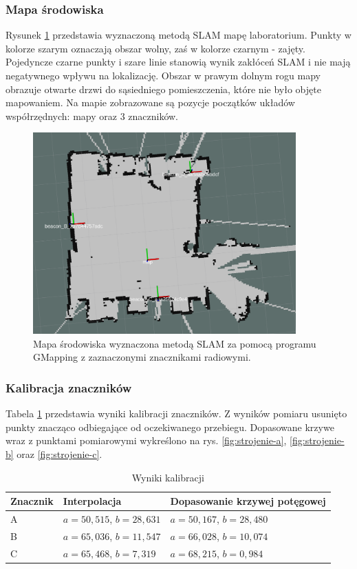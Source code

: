 \subsubsection{Mapa środowiska}
Rysunek \ref{fig:mapa} przedstawia wyznaczoną metodą SLAM mapę laboratorium. Punkty w kolorze szarym oznaczają obszar wolny, zaś w kolorze czarnym - zajęty. Pojedyncze czarne punkty i szare linie stanowią wynik zakłóceń SLAM i nie mają negatywnego wpływu na lokalizację. Obszar w prawym dolnym rogu mapy obrazuje otwarte drzwi do sąsiedniego pomieszczenia, które nie było objęte mapowaniem. Na mapie zobrazowane są pozycje początków układów współrzędnych: mapy oraz 3 znaczników. 
\begin{figure}[H]
\centering
\includegraphics[width=0.9\textwidth]{img/mapa2.png}
\caption{Mapa środowiska wyznaczona metodą SLAM za pomocą programu GMapping z zaznaczonymi znacznikami radiowymi.}
\label{fig:mapa}
\end{figure}


\subsubsection{Kalibracja znaczników}

Tabela \ref{tab:strojenie} przedstawia wyniki kalibracji znaczników. Z wyników pomiaru usunięto punkty znacząco odbiegające od oczekiwanego przebiegu. Dopasowane krzywe wraz z punktami pomiarowymi wykreślono na rys. \ref{fig:strojenie-a}, \ref{fig:strojenie-b} oraz \ref{fig:strojenie-c}.

\begin{table}[H]
 \caption{Wyniki kalibracji}
 \label{tab:strojenie}
 \begin{tabular}{|l|l|l|}
  \hline
  \textbf{Znacznik}	& \textbf{Interpolacja} & \textbf{Dopasowanie krzywej potęgowej }\\ \hline
  A 		& $a=50,515$, $b=28,631$	& $a=50,167$, $b=28,480$	\\ \hline
  B 		& $a=65,036$, $b=11,547$	& $a=66,028$, $b=10,074$	\\ \hline
  C 		& $a=65,468$, $b=7,319$		& $a=68,215$, $b=0,984$		\\ \hline
 \end{tabular}

\end{table}


